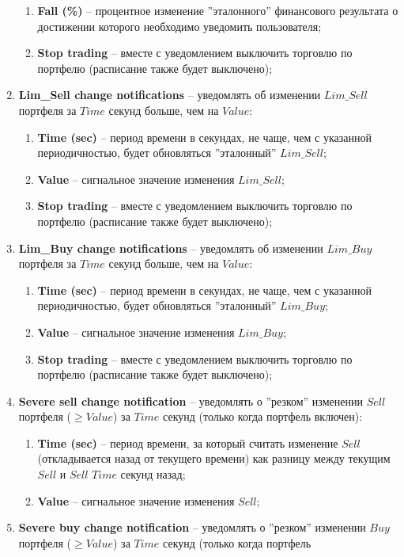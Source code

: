 \begin{enumerate}
\begin{enumerate}
		\item \textbf{Fall (\%)} -- процентное изменение ''эталонного'' финансового результата о достижении которого необходимо уведомить пользователя;
		\item \textbf{Stop trading} -- вместе с уведомлением выключить торговлю по портфелю (расписание также будет выключено);
	\end{enumerate}
	\item \textbf{Lim\_Sell change notifications} -- уведомлять об изменении $Lim\_Sell$ портфеля за $Time$ секунд больше, чем на $Value$:
	\begin{enumerate}
		\item \textbf{Time (sec)} -- период времени в секундах, не чаще, чем с указанной периодичностью, будет обновляться ''эталонный'' $Lim\_Sell$;
		\item \textbf{Value} -- сигнальное значение изменения $Lim\_Sell$;
		\item \textbf{Stop trading} -- вместе с уведомлением выключить торговлю по портфелю (расписание также будет выключено);
	\end{enumerate}
	\item \textbf{Lim\_Buy change notifications} -- уведомлять об изменении $Lim\_Buy$ портфеля за $Time$ секунд больше, чем на $Value$:
	\begin{enumerate}
		\item \textbf{Time (sec)} -- период времени в секундах, не чаще, чем с указанной периодичностью, будет обновляться ''эталонный'' $Lim\_Buy$;
		\item \textbf{Value} -- сигнальное значение изменения $Lim\_Buy$;
		\item \textbf{Stop trading} -- вместе с уведомлением выключить торговлю по портфелю (расписание также будет выключено);
	\end{enumerate}
	\item \textbf{Severe sell change notification} -- уведомлять о ''резком'' изменении $Sell$ портфеля ($\geq Value$) за $Time$ секунд (только когда портфель
		включен):
	\begin{enumerate}
		\item \textbf{Time (sec)} -- период времени, за который считать изменение $Sell$ (откладывается назад от текущего времени) как разницу между текущим
			$Sell$ и $Sell$ $Time$ секунд назад;
		\item \textbf{Value} -- сигнальное значение изменения $Sell$;
	\end{enumerate}
	\item \textbf{Severe buy change notification} -- уведомлять о ''резком'' изменении $Buy$ портфеля ($\geq Value$) за $Time$ секунд (только когда портфель

\end{enumerate}
